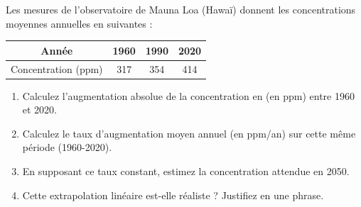 \documentclass[11pt]{article}
\begin{document}
\begin{exercice}
Les mesures de l'observatoire de Mauna Loa (Hawaï) donnent les concentrations moyennes annuelles en  suivantes :
\begin{center}
\begin{tabular}{|c|c|c|c|}
\hline
Année & 1960 & 1990 & 2020 \\
\hline
Concentration (ppm) & 317 & 354 & 414 \\
\hline
\end{tabular}
\end{center}
\begin{enumerate}
\item Calculez l'augmentation absolue de la concentration en  (en ppm) entre 1960 et 2020.
\item Calculez le taux d'augmentation moyen annuel (en ppm/an) sur cette même période (1960-2020).
\item En supposant ce taux constant, estimez la concentration attendue en 2050.
\item Cette extrapolation linéaire est-elle réaliste ? Justifiez en une phrase.
\end{enumerate}
\end{exercice}
\end{document}
